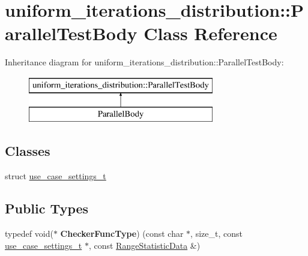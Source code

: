 \hypertarget{classuniform__iterations__distribution_1_1ParallelTestBody}{}\section{uniform\+\_\+iterations\+\_\+distribution\+:\+:Parallel\+Test\+Body Class Reference}
\label{classuniform__iterations__distribution_1_1ParallelTestBody}
Inheritance diagram for uniform\+\_\+iterations\+\_\+distribution\+:\+:Parallel\+Test\+Body\+:\begin{figure}[H]
\begin{center}
\leavevmode
\includegraphics[height=2.000000cm]{classuniform__iterations__distribution_1_1ParallelTestBody}
\end{center}
\end{figure}
\subsection*{Classes}
\begin{DoxyCompactItemize}
\item 
struct \hyperlink{structuniform__iterations__distribution_1_1ParallelTestBody_1_1use__case__settings__t}{use\+\_\+case\+\_\+settings\+\_\+t}
\end{DoxyCompactItemize}
\subsection*{Public Types}
\begin{DoxyCompactItemize}
\item 
\hypertarget{classuniform__iterations__distribution_1_1ParallelTestBody_a4ed296e0f3ae8187b6257f823c859d79}{}typedef void($\ast$ {\bfseries Checker\+Func\+Type}) (const char $\ast$, size\+\_\+t, const \hyperlink{structuniform__iterations__distribution_1_1ParallelTestBody_1_1use__case__settings__t}{use\+\_\+case\+\_\+settings\+\_\+t} $\ast$, const \hyperlink{structtest__partitioner__utils_1_1RangeStatisticData}{Range\+Statistic\+Data} \&)\label{classuniform__iterations__distribution_1_1ParallelTestBody_a4ed296e0f3ae8187b6257f823c859d79}

\end{DoxyCompactItemize}
